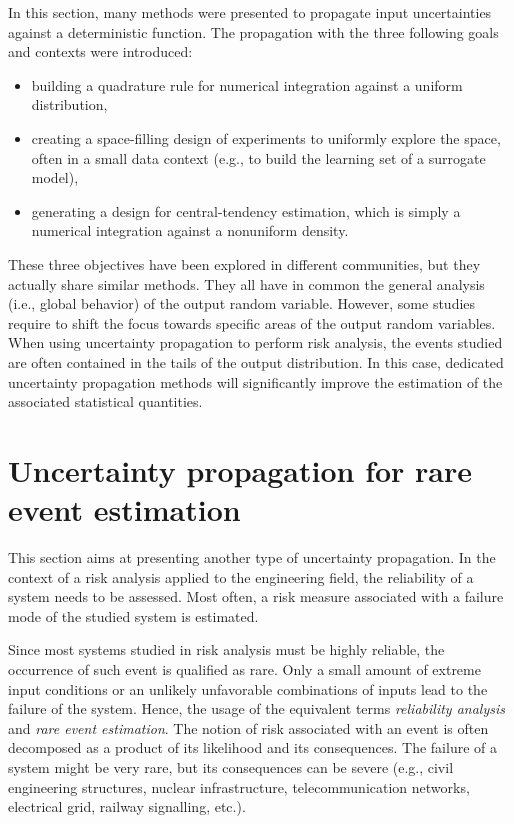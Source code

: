 In this section, many methods were presented to propagate input uncertainties against a deterministic function. 
The propagation with the three following goals and contexts were introduced: 
\begin{itemize}
    \item building a quadrature rule for numerical integration against a uniform distribution,
    \item creating a space-filling design of experiments to uniformly explore the space, often in a small data context (e.g., to build the learning set of a surrogate model),
    \item generating a design for central-tendency estimation, which is simply a numerical integration against a nonuniform density.
\end{itemize} 
These three objectives have been explored in different communities, but they actually share similar methods. 
They all have in common the general analysis (i.e., global behavior) of the output random variable. 
However, some studies require to shift the focus towards specific areas of the output random variables. 
When using uncertainty propagation to perform risk analysis, the events studied are often contained in the tails of the output distribution. 
In this case, dedicated uncertainty propagation methods will significantly improve the estimation of the associated statistical quantities.


\section{Uncertainty propagation for rare event estimation} \label{sec:reliability}

This section aims at presenting another type of uncertainty propagation. 
In the context of a risk analysis applied to the engineering field, the reliability of a system needs to be assessed. 
Most often, a risk measure associated with a failure mode of the studied system is estimated. 

Since most systems studied in risk analysis must be highly reliable, the occurrence of such event is qualified as rare. 
Only a small amount of extreme input conditions or an unlikely unfavorable combinations of inputs lead to the failure of the system. 
Hence, the usage of the equivalent terms \textit{reliability analysis} and \textit{rare event estimation}. 
The notion of risk associated with an event is often decomposed as a product of its likelihood and its consequences. 
The failure of a system might be very rare, but its consequences can be severe (e.g., civil engineering structures, nuclear infrastructure, telecommunication networks, electrical grid, railway signalling, etc.).


